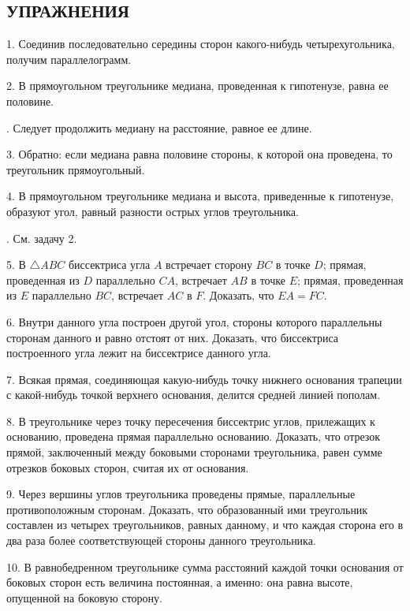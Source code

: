 \documentclass[oneside]{book}
\begin{document}
\subsection*{УПРАЖНЕНИЯ}



1.
Соединив последовательно середины сторон какого-нибудь четырехугольника, получим параллелограмм.

2.
В прямоугольном треугольнике медиана, проведенная к гипотенузе, равна ее половине.

.
Следует продолжить медиану на расстояние, равное ее длине.

3.
Обратно:
если медиана равна половине стороны, к которой она проведена, то треугольник прямоугольный.

4.
В прямоугольном треугольнике медиана и высота, приведенные к гипотенузе, образуют угол, равный разности острых углов треугольника.

.
См.
задачу 2.

5.
В $\triangle ABC$ биссектриса угла $A$ встречает сторону $BC$ в точке $D$;
прямая, проведенная из $D$ параллельно $CA$, встречает $AB$ в точке $E$;
прямая, проведенная из $E$ параллельно $BC$, встречает $AC$ в $F$.
Доказать, что $EA=FC$.

6.
Внутри данного угла построен другой угол, стороны которого параллельны сторонам данного и равно отстоят от них.
Доказать, что биссектриса построенного угла лежит на биссектрисе данного угла.

7.
Всякая прямая, соединяющая какую-нибудь точку нижнего основания трапеции с какой-нибудь точкой верхнего основания, делится средней линией пополам.

8.
В треугольнике через точку пересечения биссектрис углов, прилежащих к основанию, проведена прямая параллельно основанию.
Доказать, что отрезок прямой, заключенный между боковыми сторонами треугольника, равен сумме отрезков боковых сторон, считая их от основания.

9.
Через вершины углов треугольника проведены прямые, параллельные противоположным сторонам.
Доказать, что образованный ими треугольник составлен из четырех треугольников, равных данному, и что каждая сторона его в два раза более соответствующей стороны данного треугольника.

10.
В равнобедренном треугольнике сумма расстояний каждой точки основания от боковых сторон есть величина постоянная, а именно:
она равна высоте, опущенной на боковую сторону.
\end{document}
